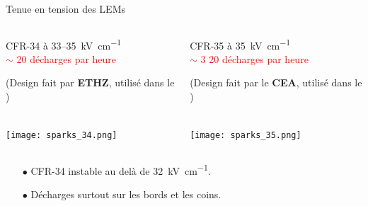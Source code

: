     \begin{frame}{Tenue en tension des LEMs}
   		\begin{columns}
    		\begin{column}{0.5\textwidth}
    			\begin{center}
	    			\begin{scriptsize}
		    			CFR-34 à 33--\SI{35}{\kilo\volt\per\centi\meter}\\
		    			\textcolor{red}{$\sim$ 20 décharges par heure}\\
		    		\end{scriptsize}
	    			\begin{tiny}
		    			(Design fait par \textbf{ETHZ}, utilisé dans le \TOO{})
		    		\end{tiny}\\
	    			\texttt{[image: sparks\_34.png]}
    			\end{center}
    		\end{column}\hfill
    		\begin{column}{0.5\textwidth}
    			\begin{center}
	    			\begin{scriptsize}
		    			CFR-35 à \SI{35}{\kilo\volt\per\centi\meter} \\
		    			\textcolor{red}{$\sim$ 3 20 décharges par heure}\\
		    		\end{scriptsize}
	    			\begin{tiny}
	    				(Design fait par le \textbf{CEA}, utilisé dans le \SSS{})
	   				\end{tiny}\\
	    			\texttt{[image: sparks\_35.png]}
	    		\end{center}
    		\end{column}
    	\end{columns}\vspace{0.1cm}
    	\begin{columns}
    		\begin{column}{0.5\textwidth}
    			\begin{scriptsize}
	    			\begin{itemize}
	    				\item[$\bullet$] CFR-34 instable au delà de \SI{32}{\kilo\volt\per\centi\meter}.
	    				\item[$\bullet$] Décharges surtout sur les bords et les coins.
	    			\end{itemize}
	    			\begin{itemize}

\end{itemize}
\end{scriptsize}
\end{column}
\end{columns}
\end{frame}
